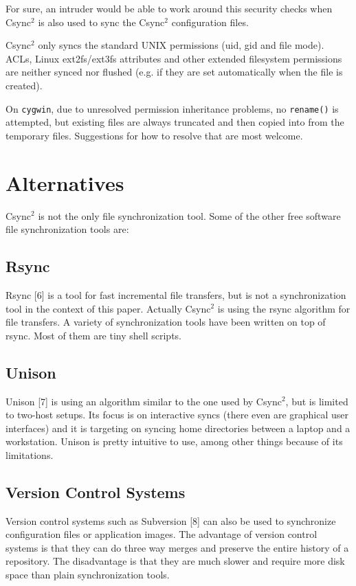 \documentclass[a4paper,twocolumn]{article}
\def\csync2{{\sc Csync$^{2}$}}
\begin{document}
For sure, an intruder would be able to work around this security checks when
\csync2 is also used to sync the \csync2 configuration files.

\csync2 only syncs the standard UNIX permissions (uid, gid and file mode).
ACLs, Linux ext2fs/ext3fs attributes and other extended filesystem permissions
are neither synced nor flushed (e.g. if they are set automatically when
the file is created).

On {\tt cygwin}, due to unresolved permission inheritance problems,
no {\tt rename()} is attempted, but existing files are always truncated
and then copied into from the temporary files.
Suggestions for how to resolve that are most welcome.

\section{Alternatives}

\csync2 is not the only file synchronization tool. Some of the other
free software file synchronization tools are:

\subsection{Rsync}

Rsync [6] is a tool for fast incremental file transfers, but is not a
synchronization tool in the context of this paper. Actually \csync2 is
using the rsync algorithm for file transfers. A variety of synchronization
tools have been written on top of rsync. Most of them are tiny shell scripts.

\subsection{Unison}

Unison [7] is using an algorithm similar to the one used by \csync2, but is
limited to two-host setups. Its focus is on interactive syncs (there even are
graphical user interfaces) and it is targeting on syncing home directories
between a laptop and a workstation. Unison is pretty intuitive to use, among
other things because of its limitations.

\subsection{Version Control Systems}

Version control systems such as Subversion [8] can also be used to synchronize
configuration files or application images. The advantage of version control
systems is that they can do three way merges and preserve the entire history
of a repository. The disadvantage is that they are much slower and require more
disk space than plain synchronization tools.
\end{document}

